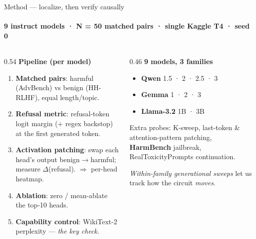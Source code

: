 \documentclass[aspectratio=169]{beamer}
\newcommand{\hl}[1]{\textcolor{themeblue}{\textbf{#1}}}
\newcommand{\hlo}[1]{\textcolor{themeorange!75!black}{\textbf{#1}}}
\begin{document}
\begin{frame}{Method --- localize, then verify causally}
  \framesubtitle{9 instruct models · N = 50 matched pairs · single Kaggle T4 · seed 0}
  \begin{columns}[T]
    \begin{column}{0.54\textwidth}
      \textbf{Pipeline (per model)}
      \begin{enumerate}
        \item \hl{Matched pairs}: harmful (AdvBench) vs benign (HH-RLHF), equal length/topic.
        \item \hl{Refusal metric}: refusal-token logit margin (+ regex backstop) at the first generated token.
        \item \hl{Activation patching}: swap each head's output benign$\rightarrow$harmful; measure $\Delta$(refusal). $\Rightarrow$ per-head heatmap.
        \item \hl{Ablation}: zero / mean-ablate the top-10 heads.
        \item \hl{Capability control}: WikiText-2 perplexity --- \emph{the key check}.
      \end{enumerate}
    \end{column}
    \begin{column}{0.46\textwidth}
      \textbf{9 models, 3 families}
      \begin{itemize}
        \item \hlo{Qwen} 1.5 · 2 · 2.5 · 3
        \item \hlo{Gemma} 1 · 2 · 3
        \item \hlo{Llama-3.2} 1B · 3B
      \end{itemize}
      \vspace{3pt}
      \footnotesize Extra probes: K-sweep, last-token \& attention-pattern patching, \hl{HarmBench} jailbreak, RealToxicityPrompts continuation.
      \par\vspace{3pt}
      \emph{Within-family generational sweeps} let us track how the circuit \emph{moves}.
    \end{column}
  \end{columns}
\end{frame}
\end{document}
